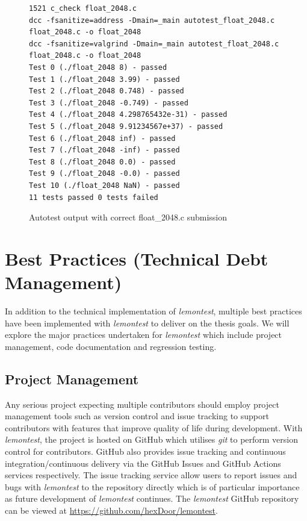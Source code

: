 \documentclass[hidelinks]{report}
\begin{document}
\begin{figure}[h]
	\centering
	\begin{lstlisting}[breaklines=true, linewidth=\linewidth, tabsize=4]
1521 c_check float_2048.c
dcc -fsanitize=address -Dmain=_main autotest_float_2048.c float_2048.c -o float_2048
dcc -fsanitize=valgrind -Dmain=_main autotest_float_2048.c float_2048.c -o float_2048
Test 0 (./float_2048 8) - passed
Test 1 (./float_2048 3.99) - passed
Test 2 (./float_2048 0.748) - passed
Test 3 (./float_2048 -0.749) - passed
Test 4 (./float_2048 4.298765432e-31) - passed
Test 5 (./float_2048 9.91234567e+37) - passed
Test 6 (./float_2048 inf) - passed
Test 7 (./float_2048 -inf) - passed
Test 8 (./float_2048 0.0) - passed
Test 9 (./float_2048 -0.0) - passed
Test 10 (./float_2048 NaN) - passed
11 tests passed 0 tests failed
	\end{lstlisting}
	\caption{Autotest output with correct float\_2048.c submission}
	\label{fig:floatAutotest}
\end{figure}

\clearpage
\section{Best Practices (Technical Debt Management)}
In addition to the technical implementation of \textit{lemontest}, multiple best practices have been implemented with \textit{lemontest} to deliver on the thesis goals. We will explore the major practices undertaken for \textit{lemontest} which include project management, code documentation and regression testing.

\subsection{Project Management}
Any serious project expecting multiple contributors should employ project management tools such as version control and issue tracking to support contributors with features that improve quality of life during development. With \textit{lemontest}, the project is hosted on GitHub which utilises \textit{git} to perform version control for contributors. GitHub also provides issue tracking and continuous integration/continuous delivery via the GitHub Issues and GitHub Actions services respectively. The issue tracking service allow users to report issues and bugs with \textit{lemontest} to the repository directly which is of particular importance as future development of \textit{lemontest} continues.
The \textit{lemontest} GitHub repository can be viewed at \url{https://github.com/hexDoor/lemontest}.
\end{document}
